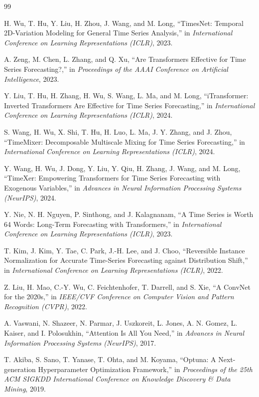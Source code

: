 \documentclass[10pt,journal]{IEEEtran}
\begin{document}
\begin{thebibliography}{99}

H. Wu, T. Hu, Y. Liu, H. Zhou, J. Wang, and M. Long, ``TimesNet: Temporal 2D-Variation Modeling for General Time Series Analysis,'' in \emph{International Conference on Learning Representations (ICLR)}, 2023.

A. Zeng, M. Chen, L. Zhang, and Q. Xu, ``Are Transformers Effective for Time Series Forecasting?,'' in \emph{Proceedings of the AAAI Conference on Artificial Intelligence}, 2023.

Y. Liu, T. Hu, H. Zhang, H. Wu, S. Wang, L. Ma, and M. Long, ``iTransformer: Inverted Transformers Are Effective for Time Series Forecasting,'' in \emph{International Conference on Learning Representations (ICLR)}, 2024.

S. Wang, H. Wu, X. Shi, T. Hu, H. Luo, L. Ma, J. Y. Zhang, and J. Zhou, ``TimeMixer: Decomposable Multiscale Mixing for Time Series Forecasting,'' in \emph{International Conference on Learning Representations (ICLR)}, 2024.

Y. Wang, H. Wu, J. Dong, Y. Liu, Y. Qiu, H. Zhang, J. Wang, and M. Long, ``TimeXer: Empowering Transformers for Time Series Forecasting with Exogenous Variables,'' in \emph{Advances in Neural Information Processing Systems (NeurIPS)}, 2024.

Y. Nie, N. H. Nguyen, P. Sinthong, and J. Kalagnanam, ``A Time Series is Worth 64 Words: Long-Term Forecasting with Transformers,'' in \emph{International Conference on Learning Representations (ICLR)}, 2023.

T. Kim, J. Kim, Y. Tae, C. Park, J.-H. Lee, and J. Choo, ``Reversible Instance Normalization for Accurate Time-Series Forecasting against Distribution Shift,'' in \emph{International Conference on Learning Representations (ICLR)}, 2022.

Z. Liu, H. Mao, C.-Y. Wu, C. Feichtenhofer, T. Darrell, and S. Xie, ``A ConvNet for the 2020s,'' in \emph{IEEE/CVF Conference on Computer Vision and Pattern Recognition (CVPR)}, 2022.

A. Vaswani, N. Shazeer, N. Parmar, J. Uszkoreit, L. Jones, A. N. Gomez, L. Kaiser, and I. Polosukhin, ``Attention Is All You Need,'' in \emph{Advances in Neural Information Processing Systems (NeurIPS)}, 2017.

T. Akiba, S. Sano, T. Yanase, T. Ohta, and M. Koyama, ``Optuna: A Next-generation Hyperparameter Optimization Framework,'' in \emph{Proceedings of the 25th ACM SIGKDD International Conference on Knowledge Discovery \& Data Mining}, 2019.


\end{thebibliography}
\end{document}
